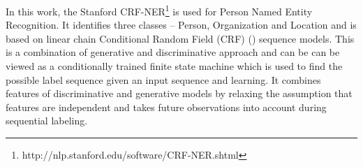 In this work, the Stanford CRF-NER\footnote{http://nlp.stanford.edu/software/CRF-NER.shtml} is used for Person Named Entity Recognition. It identifies three classes -- Person, Organization and Location and is based on linear chain Conditional Random Field (CRF) (\cite{mccallum2003early, finkel2005incorporating, sutton2011introduction}) sequence models. This is a combination of generative and discriminative approach and can be can be viewed as a conditionally trained finite state machine which is used to find the possible label sequence given an input sequence and learning. It combines features of discriminative and generative models by relaxing the assumption that features are independent and takes future observations into account during sequential labeling. 









